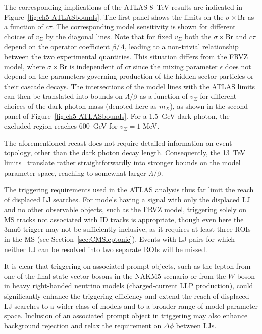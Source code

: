 The corresponding implications of the ATLAS 8~TeV results are indicated in Figure~\ref{fig:ch5-ATLASbounds}. The first panel shows the limits on the $\sigma\times\mathrm{Br}$ as a function of $c\tau$. The corresponding model sensitivity is shown for different choices of $v_\Sigma$ by the diagonal lines. Note that for fixed $v_\Sigma$ both the $\sigma\times\mathrm{Br}$ and $c\tau$ depend on the operator coefficient $\beta/\Lambda$, leading to a non-trivial relationship between the two experimental quantities. This situation differs from the FRVZ model, where $\sigma\times\mathrm{Br}$ is independent of $c\tau$ since the mixing parameter $\epsilon$ does not depend on the parameters governing production of the hidden sector particles or their cascade decays. The intersections of the model lines with the ATLAS limits can then be translated into bounds on $\Lambda/\beta$ as a function of $v_\Sigma$ for different choices of the dark photon mass (denoted here as $m_X$), as shown in the second panel of Figure~\ref{fig:ch5-ATLASbounds}. For a 1.5~GeV dark photon, the excluded region reaches \mbox{600~GeV} for $v_\Sigma = 1 $ MeV.

The aforementioned recast does not require detailed information on event topology, other than the dark photon decay length. Consequently, the 13~TeV limits~\cite{ATLAS-CONF-2016-042} translate rather straightforwardly into stronger bounds on the model parameter space, reaching to somewhat larger $\Lambda/\beta$.

\vskip 0.1in
\vskip 0.1in

The triggering requirements used in the ATLAS analysis thus far limit the reach of displaced LJ searches. For models having a signal with only the displaced LJ and no other observable objects, such as the FRVZ model, triggering solely on MS tracks not associated with ID tracks is appropriate, though even here the 3mu6 trigger may not be sufficiently inclusive, as it requires at least three ROIs in the MS (see Section~\ref{sec:CMSleptonic}). Events with LJ pairs for which neither LJ can be resolved into two separate ROIs will be missed.

It is clear that triggering on associated prompt objects, such as the lepton from one of the final state vector bosons in the NAKM5 scenario or from the $W$ boson in heavy right-handed neutrino models (charged-current LLP production), could significantly enhance the triggering efficiency and extend the reach of displaced LJ searches to a wider class of models and to a broader range of model parameter space. Inclusion of an associated prompt object in triggering may also enhance background rejection and relax the requirement on $\Delta\phi$ between LJs.

